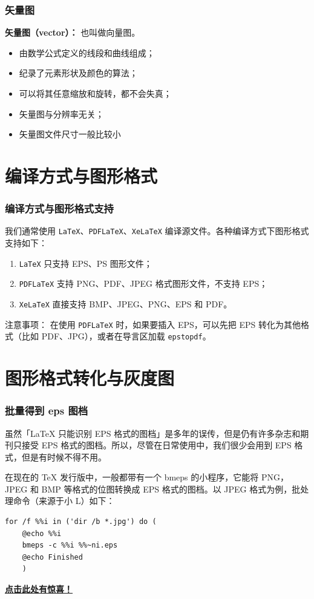 \documentclass[10pt]{beamer}
\numberwithin{figure}{section}
\newcommand{\pbf}[1]{\noindent\textbf{#1}}
\begin{document}
\begin{frame}[c]\frametitle{矢量图}

\pbf{矢量图（vector）：} 也叫做向量图。

\begin{itemize}
  \item 由数学公式定义的线段和曲线组成；
  \item 纪录了元素形状及颜色的算法；
  \item 可以将其任意缩放和旋转，都不会失真；
  \item 矢量图与分辨率无关；
  \item 矢量图文件尺寸一般比较小
\end{itemize}
\end{frame}

\section[编译方式支持]{编译方式与图形格式}

\begin{frame}[c,fragile]\frametitle{编译方式与图形格式支持}

我们通常使用 \lstinline{LaTeX}、\lstinline{PDFLaTeX}、\lstinline{XeLaTeX} 编译源文件。各种编译方式下图形格式支持如下：

\begin{enumerate}
  \item \lstinline{LaTeX} 只支持 EPS、PS 图形文件；
  \item \lstinline{PDFLaTeX} 支持 PNG、PDF、JPEG 格式图形文件，不支持 EPS；
  \item \lstinline{XeLaTeX} 直接支持 BMP、JPEG、PNG、EPS 和 PDF。
\end{enumerate}

\begin{alertblock}{注意事项：}
在使用 \lstinline{PDFLaTeX} 时，如果要插入 EPS，可以先把 EPS 转化为其他格式（比如 PDF、JPG），或者在导言区加载 \lstinline{epstopdf}。
\end{alertblock}

\end{frame}


\section[格式转化]{图形格式转化与灰度图}
\begin{frame}[c,fragile]\frametitle{批量得到 eps 图档}
虽然「\LaTeX{} 只能识别 EPS 格式的图档」是多年的误传，但是仍有许多杂志和期刊只接受 EPS 格式的图档。所以，尽管在日常使用中，我们很少会用到 EPS 格式，但是有时候不得不用。

在现在的 TeX 发行版中，一般都带有一个 bmeps 的小程序，它能将 PNG，JPEG 和 BMP 等格式的位图转换成 EPS 格式的图档。以 JPEG 格式为例，批处理命令（来源于小 L）如下：
\begin{lstlisting}
for /f %%i in ('dir /b *.jpg') do (
    @echo %%i
    bmeps -c %%i %%~ni.eps
    @echo Finished
    )
\end{lstlisting}

\href{http://liam0205.me/2014/08/21/bitmap-convert-to-eps-batch/}{\textbf{点击此处有惊喜！}}

\end{frame}
\end{document}
